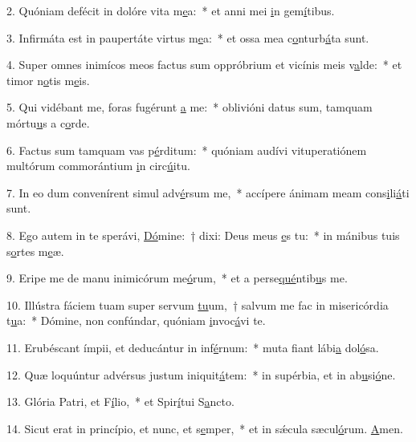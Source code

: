 2. Quóniam defécit in dolóre vita m\uline{e}a:~* et anni mei \uline{i}n gem\uline{í}tibus.\par 
3. Infirmáta est in paupertáte virtus m\uline{e}a:~* et ossa mea c\uline{o}nturb\uline{á}ta sunt.\par 
4. Super omnes inimícos meos factus sum oppróbrium et vicínis meis v\uline{a}lde:~* et timor n\uline{o}tis m\uline{e}is.\par 
5. Qui vidébant me, foras fugérunt \uline{a} me:~* oblivióni datus sum, tamquam mórtu\uline{u}s a c\uline{o}rde.\par 
6. Factus sum tamquam vas p\uline{é}rditum:~* quóniam audívi vituperatiónem multórum commorántium \uline{i}n circ\uline{ú}itu.\par 
7. In eo dum convenírent simul adv\uline{é}rsum me,~* accípere ánimam meam cons\uline{i}li\uline{á}ti sunt.\par 
8. Ego autem in te sperávi, \uline{Dó}mine:~† dixi: Deus meus \uline{e}s tu:~* in mánibus tuis s\uline{o}rtes m\uline{e}æ.\par 
9. Eripe me de manu inimicórum me\uline{ó}rum,~* et a perse\uline{qué}ntib\uline{u}s me.\par 
10. Illústra fáciem tuam super servum \uline{tu}um,~† salvum me fac in misericórdia t\uline{u}a:~* Dómine, non confúndar, quóniam \uline{i}nvoc\uline{á}vi te.\par 
11. Erubéscant ímpii, et deducántur in inf\uline{é}rnum:~* muta fiant lábi\uline{a} dol\uline{ó}sa.\par 
12. Quæ loquúntur advérsus justum iniquit\uline{á}tem:~* in supérbia, et in ab\uline{u}si\uline{ó}ne.\par 
13. Glória Patri, et F\uline{í}lio,~* et Spir\uline{í}tui S\uline{a}ncto.\par 
14. Sicut erat in princípio, et nunc, et s\uline{e}mper,~* et in sǽcula sæcul\uline{ó}rum. \uline{A}men.\par 
